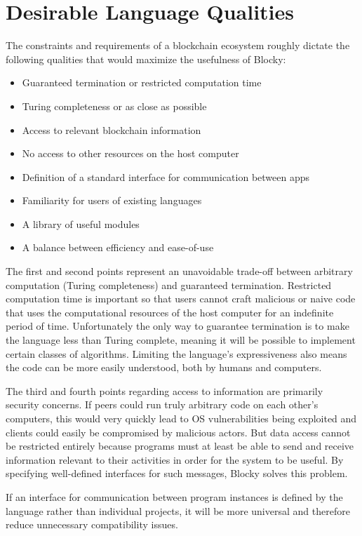 \documentclass[letterpaper]{article}
\begin{document}
\section{Desirable Language Qualities}

The constraints and requirements of a blockchain ecosystem roughly dictate the following qualities that would maximize the usefulness of Blocky:
\begin{itemize}
  \item{Guaranteed termination or restricted computation time}
  \item{Turing completeness or as close as possible}
  \item{Access to relevant blockchain information}
  \item{No access to other resources on the host computer}
  \item{Definition of a standard interface for communication between apps}
  \item{Familiarity for users of existing languages}
  \item{A library of useful modules}
  \item{A balance between efficiency and ease-of-use}
\end{itemize}

The first and second points represent an unavoidable trade-off between arbitrary computation (Turing completeness) and guaranteed termination. Restricted computation time is important so that users cannot craft malicious or naive code that uses the computational resources of the host computer for an indefinite period of time. Unfortunately the only way to guarantee termination is to make the language less than Turing complete, meaning it will be possible to implement certain classes of algorithms\cite{turing37}. Limiting the language's expressiveness also means the code can be more easily understood, both by humans and computers\cite{plant15}.

The third and fourth points regarding access to information are primarily security concerns. If peers could run truly arbitrary code on each other's computers, this would very quickly lead to OS vulnerabilities being exploited and clients could easily be compromised by malicious actors. But data access cannot be restricted entirely because programs must at least be able to send and receive information relevant to their activities in order for the system to be useful. By specifying well-defined interfaces for such messages, Blocky solves this problem.

If an interface for communication between program instances is defined by the language rather than individual projects, it will be more universal and therefore reduce unnecessary compatibility issues.
\end{document}
